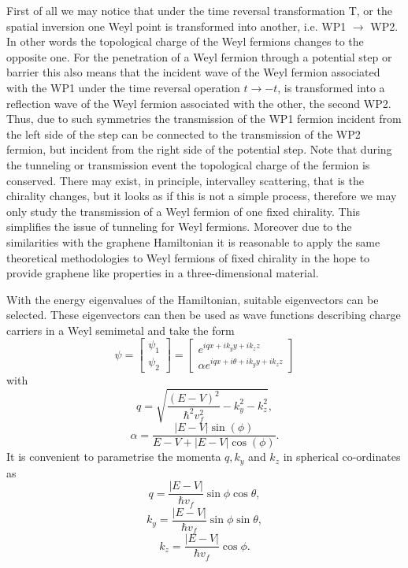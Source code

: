 \documentclass[prb,twocolumn,aps,superscriptaddress,showpacs,floatfix]{revtex4}
\begin{document}
	First of all we may notice that under the time reversal transformation T, or the spatial inversion one Weyl point is transformed into another, i.e. WP1 $\rightarrow$ WP2. In other words the topological charge of the Weyl fermions changes to the opposite one. For the penetration of a Weyl fermion through a potential step or barrier this also means that the incident wave of the Weyl fermion associated with the WP1 under the time reversal operation  $t\rightarrow -t$, is transformed into a reflection wave of the Weyl fermion associated with the other, the second WP2. Thus, due to such symmetries the transmission of the WP1 fermion incident from the left side of the step can be connected to the transmission of the WP2 fermion, but incident from the right side of the potential step. Note that during the tunneling or transmission event the topological charge of the fermion is conserved. There may exist, in principle, intervalley scattering, that is the chirality changes, but it looks as if this is not a simple process, therefore we may only study the transmission of a Weyl fermion of one fixed chirality. This simplifies the issue of tunneling for Weyl fermions. Moreover due to the similarities with the graphene Hamiltonian it is reasonable to apply the same theoretical methodologies to Weyl fermions of fixed chirality in the hope to provide graphene like properties in a three-dimensional material.

	 With the energy eigenvalues of the Hamiltonian, suitable eigenvectors can be selected. These eigenvectors can then be used as wave functions describing charge carriers in a Weyl semimetal and take the form
\begin{equation}
	\psi=
	\left[\begin{array}{ccc}
		\psi_{1}\\
		\psi_{2}
	\end{array}\right]
	=
	\left[\begin{array}{ccc}
		e^{iqx+ik_{y}y+ik_{z}z}\\
		\alpha e^{iqx+i\theta+ik_{y}y+ik_{z}z}
	\end{array}\right]
	\label{wave-functions}
\end{equation}
with
\begin{equation}
	q=\sqrt{\frac{\left(E-V\right)^{2}}{\hbar^{2}v_{f}^{2}}-k_{y}^{2}-k_{z}^{2}},
\end{equation}
\begin{equation}
	\alpha=\frac{|E-V|\sin\left(\phi\right)}{E-V+|E-V|\cos\left(\phi\right)}.
\end{equation}
It is convenient  to parametrise the momenta $q, k_y$ and $k_z$ in spherical co-ordinates as
\begin{equation}
	q=\frac{|E-V|}{\hbar v_{f}}\sin\phi \cos\theta,
\end{equation}
\begin{equation}
	k_{y}=\frac{|E-V|}{\hbar v_{f}}\sin\phi \sin\theta,
\end{equation}
\begin{equation}
	k_{z}=\frac{|E-V|}{\hbar v_{f}}\cos\phi.
\end{equation}
\end{document}
